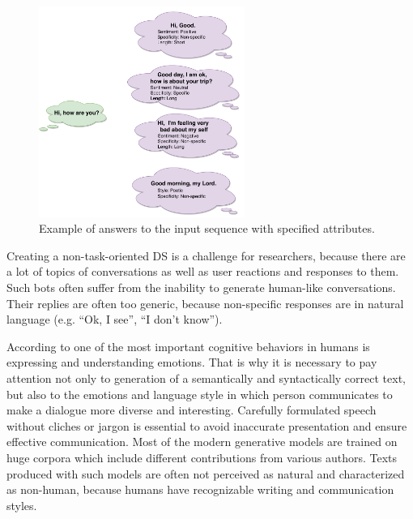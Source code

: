 \begin{figure}
  \centering
  \includegraphics[width=0.6\textwidth]{figures/dialogue_example.pdf}
  \caption{Example of answers to the input sequence with specified attributes.}
  \label{dialogue_example}
\end{figure}

Creating a non-task-oriented DS is a challenge for researchers, because there are a lot of topics of conversations as well as user reactions and responses to them. Such bots often suffer from the inability to generate human-like conversations. Their replies are often too generic, because non-specific responses are in natural language (e.g. ``Ok, I see'', ``I don't know''). 

According to \cite{salovey1990emotional} one of the most important cognitive behaviors in humans is expressing and understanding emotions. That is why it is necessary to pay attention not only to generation of a semantically and syntactically correct text, but also to the emotions and language style in which person communicates to make a dialogue more diverse and interesting. Carefully formulated speech without cliches or jargon is essential to avoid inaccurate presentation and ensure effective communication. Most of the modern generative models are trained on huge corpora which include different contributions from various authors. Texts produced with such models are often not perceived as natural and characterized as non-human, because humans have recognizable writing and communication styles.

